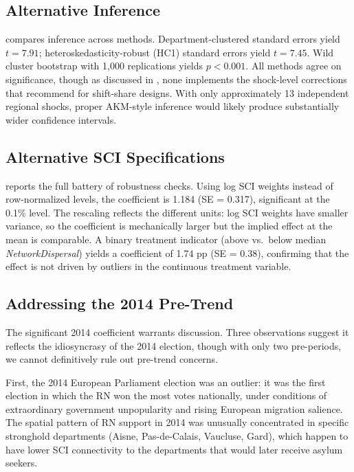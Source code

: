 \documentclass[12pt]{article}
\begin{document}
\subsection{Alternative Inference}



 compares inference across methods. Department-clustered standard errors yield $t = 7.91$; heteroskedasticity-robust (HC1) standard errors yield $t = 7.45$. Wild cluster bootstrap with 1,000 replications yields $p < 0.001$. All methods agree on significance, though as discussed in , none implements the shock-level corrections that \citet{adao2019shift} recommend for shift-share designs. With only approximately 13 independent regional shocks, proper AKM-style inference would likely produce substantially wider confidence intervals.

\subsection{Alternative SCI Specifications}



 reports the full battery of robustness checks. Using log SCI weights instead of row-normalized levels, the coefficient is 1.184 (SE = 0.317), significant at the 0.1\% level. The rescaling reflects the different units: log SCI weights have smaller variance, so the coefficient is mechanically larger but the implied effect at the mean is comparable. A binary treatment indicator (above vs.\ below median \textit{NetworkDispersal}) yields a coefficient of 1.74 pp (SE = 0.38), confirming that the effect is not driven by outliers in the continuous treatment variable.

\subsection{Addressing the 2014 Pre-Trend}

The significant 2014 coefficient warrants discussion. Three observations suggest it reflects the idiosyncrasy of the 2014 election, though with only two pre-periods, we cannot definitively rule out pre-trend concerns.

First, the 2014 European Parliament election was an outlier: it was the first election in which the RN won the most votes nationally, under conditions of extraordinary government unpopularity and rising European migration salience. The spatial pattern of RN support in 2014 was unusually concentrated in specific stronghold departments (Aisne, Pas-de-Calais, Vaucluse, Gard), which happen to have lower SCI connectivity to the departments that would later receive asylum seekers.
\end{document}
